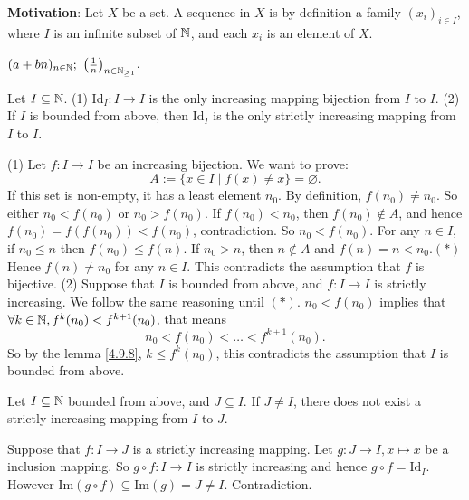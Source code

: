 \textbf{Motivation}: Let $X$ be a set. A sequence in $X$ is by definition a family $(x_i)_{i\in I}$,  where $I$ is an infinite subset of $\mathbb{N}$,  and each $x_i$ is an element of $X$.
\begin{exampleenv}
    $(a+bn)_{n\in \NN};\ \left(\frac{1}{n}\right)_{n\in \NN_{\ge 1}}$.
\end{exampleenv}
\begin{propositionenv}
    Let $I\subseteq \mathbb{N}$.
    \newline
    (1) $\mathrm{Id}_I:I\rightarrow I$ is the only increasing mapping bijection from $I$ to $I$.
    \newline
    (2) If $I$ is bounded from above,  then $\mathrm{Id}_I$ is the only strictly increasing mapping from $I$ to $I$.
\end{propositionenv}
\begin{proofenv}
    \quad
    \newline
    (1) Let $f:I\rightarrow I$ be an increasing bijection. We want to prove:
    $$A:=\{x\in I\mid f(x)\not=x\}=\varnothing.$$
    If this set is non-empty,  it has a least element $n_0$. By definition,  $f(n_0)\not=n_0$. So either $n_0<f(n_0)$ or $n_0>f(n_0)$.
    \newline
    If $f(n_0)<n_0$,  then $f(n_0)\notin A$,  and hence $f(n_0)=f(f(n_0))<f(n_0)$,  contradiction. So $n_0<f(n_0)$. For any $n\in I$,  if $n_0\le n$ then $f(n_0)\le f(n)$. If $n_0>n$,  then $n\notin A$ and $f(n)=n<n_0$.$(*)$Hence $f(n)\not=n_0$ for any $n\in I$. This contradicts the assumption that $f$ is bijective.
    \newline
    (2) Suppose that $I$ is bounded from above,  and $f:I\rightarrow I$ is strictly increasing. We follow the same reasoning until $(*)$. $n_0<f(n_0)$ implies that $\forall k \in \mathbb{N},  f^k(n_0)<f^{k+1}(n_0)$,  that means 
    $$n_0<f(n_0)<\dots <f^{k+1}(n_0).$$
    So by the lemma \ref{4.9.8},  $k\le f^k(n_0)$,  this contradicts the assumption that $I$ is bounded from above.
\end{proofenv}
\begin{corollaryenv}
    Let $I\subseteq \mathbb{N}$ bounded from above, and $J\subseteq I$. If $J\not=I$,  there does not exist a strictly increasing mapping from $I$ to $J$.
\end{corollaryenv}
\begin{proofenv}
    Suppose that $f:I\rightarrow J$ is a strictly increasing mapping. Let $g:J\rightarrow I, x\mapsto x$ be a inclusion mapping. So $g\circ f:I\rightarrow I$ is strictly increasing and hence $g\circ f=\mathrm{Id}_I$. However $\mathrm{Im}(g\circ f)\subseteq\mathrm{Im}(g)=J\not=I$. Contradiction.
\end{proofenv}
